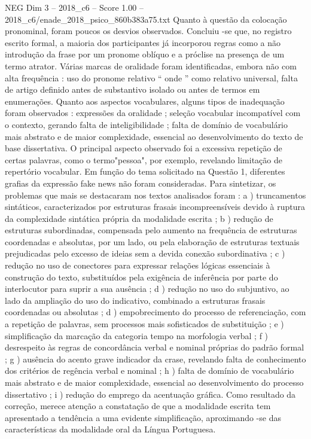 \begin{textsample}{NEG Dim 3 – 2018\_c6 – Score 1.00 – 2018\_c6/enade\_2018\_psico\_860b383a75.txt}
Quanto à questão da colocação pronominal, foram poucos os desvios observados.
Concluiu -se que, no registro escrito formal, a maioria dos participantes já incorporou regras como a não introdução da frase por um pronome oblíquo e a próclise na presença de um termo atrator.
Várias marcas de oralidade foram identificadas, embora não com alta frequência : uso do pronome relativo “ onde ” como relativo universal, falta de artigo definido antes de substantivo isolado ou antes de termos em enumerações.
Quanto aos aspectos vocabulares, alguns tipos de inadequação foram observados : expressões da oralidade ; seleção vocabular incompatível com o contexto, gerando falta de inteligibilidade ; falta de domínio de vocabulário mais abstrato e de maior complexidade, essencial ao desenvolvimento do texto de base dissertativa.
O principal aspecto observado foi a excessiva repetição de certas palavras, como o termo"pessoa", por exemplo, revelando limitação de repertório vocabular.
Em função do tema solicitado na Questão 1, diferentes grafias da expressão fake news não foram consideradas.
Para sintetizar, os problemas que mais se destacaram nos textos analisados foram : a ) truncamentos sintáticos, caracterizados por estruturas frasais incompreensíveis devido à ruptura da complexidade sintática própria da modalidade escrita ; b ) redução de estruturas subordinadas, compensada pelo aumento na frequência de estruturas coordenadas e absolutas, por um lado, ou pela elaboração de estruturas textuais prejudicadas pelo excesso de ideias sem a devida conexão subordinativa ; c ) redução no uso de conectores para expressar relações lógicas essenciais à construção do texto, substituídos pela exigência de inferência por parte do interlocutor para suprir a sua ausência ; d ) redução no uso do subjuntivo, ao lado da ampliação do uso do indicativo, combinado a estruturas frasais coordenadas ou absolutas ; d ) empobrecimento do processo de referenciação, com a repetição de palavras, sem processos mais sofisticados de substituição ; e ) simplificação da marcação da categoria tempo na morfologia verbal ; f ) desrespeito às regras de concordância verbal e nominal próprias do padrão formal ; g ) ausência do acento grave indicador da crase, revelando falta de conhecimento dos critérios de regência verbal e nominal ; h ) falta de domínio de vocabulário mais abstrato e de maior complexidade, essencial ao desenvolvimento do processo dissertativo ; i ) redução do emprego da acentuação gráfica.
Como resultado da correção, merece atenção a constatação de que a modalidade escrita tem apresentado a tendência a uma evidente simplificação, aproximando -se das características da modalidade oral da Língua Portuguesa.

\end{textsample}
